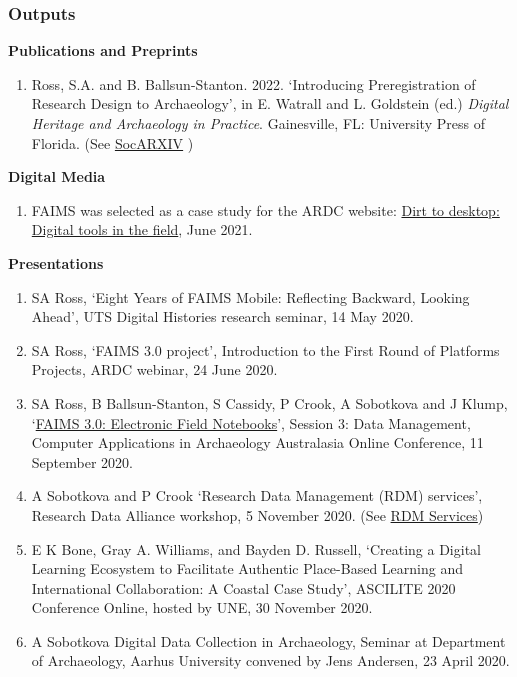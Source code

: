 \documentclass[
	aspectratio=169, %
	11pt, %
	t, %
]{beamer}
\begin{document}
\begin{frame}[allowframebreaks]
	\frametitle{Outputs}
    
    \textbf{Publications and Preprints}
    \begin{enumerate}
    \item Ross, S.A. and B. Ballsun-Stanton. 2022. `Introducing Preregistration of Research Design to Archaeology', in E. Watrall and L. Goldstein (ed.) \textit{Digital Heritage and Archaeology in Practice}. Gainesville, FL: University Press of Florida. (See  \href{https://osf.io/preprints/socarxiv/sbwcq}{SocARXIV} )
    \end{enumerate}
    
    \textbf{Digital Media}
    \begin{enumerate}
    \item  FAIMS was selected as a case study for the ARDC website: \href{https://ardc.edu.au/about_us/case-studies/dirt-to-desktop-digital-tools-in-the-field/}{Dirt to desktop: Digital tools in the field}, June 2021.
    \end{enumerate}
    \textbf{Presentations}
        \begin{enumerate}
            \item SA Ross, ‘Eight Years of FAIMS Mobile: Reflecting Backward, Looking Ahead’, UTS Digital Histories research seminar, 14 May 2020.
            \item SA Ross, ‘FAIMS 3.0 project’, Introduction to the First Round of Platforms Projects, ARDC webinar, 24 June 2020. 
            \item SA Ross, B Ballsun-Stanton, S Cassidy, P Crook, A Sobotkova and J Klump, `\href{https://github.com/saross/FAIMS-intro/releases/tag/v3.0}{FAIMS 3.0: Electronic Field Notebooks}', Session 3: Data Management, Computer Applications in Archaeology Australasia Online Conference, 11 September 2020.
               \item A Sobotkova and P Crook ‘Research Data Management (RDM) services’, Research Data Alliance workshop, 5 November 2020. (See \href{https://wiki.geant.org/display/EV/RDM-Services}{RDM Services})
	        \item E K Bone, Gray A. Williams, and Bayden D. Russell, ‘Creating a Digital Learning Ecosystem to Facilitate Authentic Place-Based Learning and International Collaboration: A Coastal Case Study’, ASCILITE 2020 Conference Online, hosted by UNE, 30 November 2020.
            \item A Sobotkova Digital Data Collection in Archaeology, Seminar at Department of Archaeology, Aarhus University convened by Jens Andersen, 23 April 2020.

\end{enumerate}
\end{frame}
\end{document}
